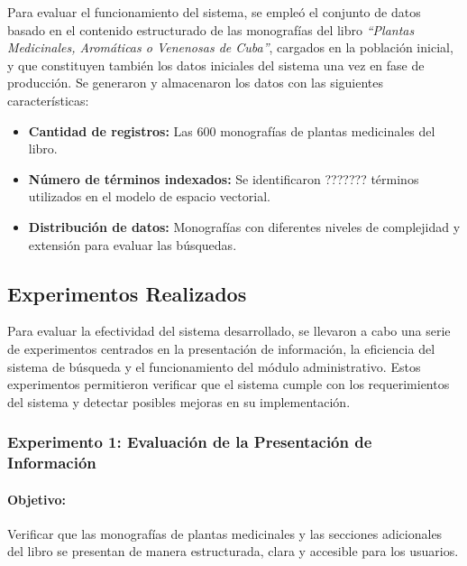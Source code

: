 Para evaluar el funcionamiento del sistema, se empleó el conjunto de datos basado en el contenido estructurado 
de las monografías del libro \textit{``Plantas Medicinales, Aromáticas o Venenosas de Cuba''}, cargados en la población inicial, 
y que constituyen también los datos iniciales del sistema una vez en fase de producción. Se generaron y 
almacenaron los datos con las siguientes características:

\begin{itemize}
    \item \textbf{Cantidad de registros:} Las 600 monografías de plantas medicinales del libro.
    \item \textbf{Número de términos indexados:} Se identificaron ??????? términos utilizados en el modelo de espacio vectorial.
    \item \textbf{Distribución de datos:} Monografías con diferentes niveles de complejidad y extensión para evaluar las búsquedas.
\end{itemize}





\subsection{Experimentos Realizados}
Para evaluar la efectividad del sistema desarrollado, se llevaron a cabo una serie de experimentos centrados en la presentación 
de información, la eficiencia del sistema de búsqueda y el funcionamiento del módulo administrativo. Estos experimentos permitieron 
verificar que el sistema cumple con los requerimientos del sistema y detectar posibles mejoras en su implementación.

\subsubsection*{Experimento 1: Evaluación de la Presentación de Información}
\paragraph{Objetivo:}
Verificar que las monografías de plantas medicinales y las secciones adicionales del libro se presentan de manera estructurada, 
clara y accesible para los usuarios.
